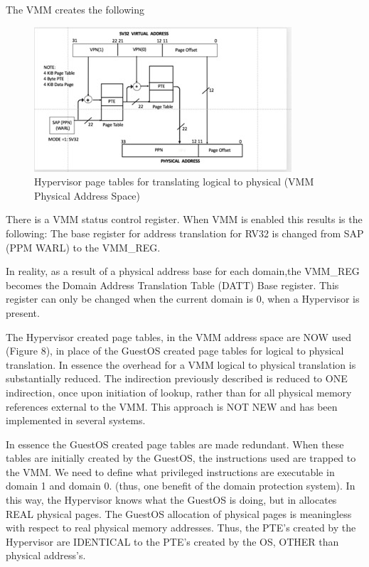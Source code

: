 \documentclass{article}
\begin{document}
The VMM creates the following


\begin{figure}
\includegraphics[scale = .9]
{figures/figure8_hypervisor_page_table.jpg}
\caption{Hypervisor  page tables for translating logical to physical (VMM Physical Address Space)}
\end{figure}

There is a VMM status  control register.  When VMM is enabled this results is the following: The base register for address translation for RV32 is changed from SAP (PPM WARL)  to the VMM\_REG. 

 In reality, as a result of a physical address base for each domain,the VMM\_REG becomes the   Domain Address Translation Table (DATT) Base   register.  This register can only be changed when the current domain is 0, when a Hypervisor is present.


 The Hypervisor created page tables, in the VMM address space are NOW used (Figure 8), in place of the GuestOS created page tables for logical to physical  translation.   In essence the overhead for a VMM logical to physical  translation is substantially reduced.   The indirection previously described is reduced to ONE indirection, once upon   initiation of lookup,  rather than for all physical memory references external to the VMM. This approach is NOT NEW and has been implemented in several systems.

In essence the GuestOS created page tables are made redundant.  When these tables are initially created by the GuestOS,   the instructions used are trapped to the VMM.  We need to define what privileged instructions are executable in domain 1 and domain 0.  (thus, one benefit of the domain protection system). In this way,  the Hypervisor knows what the GuestOS is doing, but in allocates REAL physical pages.  The GuestOS allocation of physical pages is  meaningless with respect to real physical memory addresses. Thus, the PTE’s created by the Hypervisor are IDENTICAL to the PTE’s created by the OS, OTHER than physical address’s.  
\end{document}

